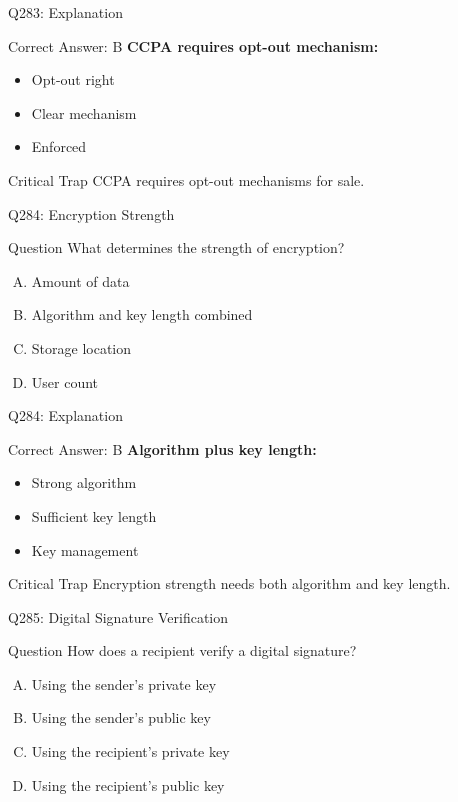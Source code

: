 \documentclass{beamer}
\begin{document}
	\begin{frame}{Q283: Explanation}
		\begin{block}{Correct Answer: B}
			\textbf{CCPA requires opt-out mechanism:}
			\begin{itemize}
				\item Opt-out right
				\item Clear mechanism
				\item Enforced
			\end{itemize}
		\end{block}
		\begin{alertblock}{Critical Trap}
			CCPA requires opt-out mechanisms for sale.
		\end{alertblock}
	\end{frame}
	
	\begin{frame}{Q284: Encryption Strength}
		\begin{block}{Question}
			What determines the strength of encryption?
		\end{block}
		\begin{enumerate}[(A)]
			\item Amount of data
			\item Algorithm and key length combined
			\item Storage location
			\item User count
		\end{enumerate}
	\end{frame}
	
	\begin{frame}{Q284: Explanation}
		\begin{block}{Correct Answer: B}
			\textbf{Algorithm plus key length:}
			\begin{itemize}
				\item Strong algorithm
				\item Sufficient key length
				\item Key management
			\end{itemize}
		\end{block}
		\begin{alertblock}{Critical Trap}
			Encryption strength needs both algorithm and key length.
		\end{alertblock}
	\end{frame}
	
	\begin{frame}{Q285: Digital Signature Verification}
		\begin{block}{Question}
			How does a recipient verify a digital signature?
		\end{block}
		\begin{enumerate}[(A)]
			\item Using the sender's private key
			\item Using the sender's public key
			\item Using the recipient's private key
			\item Using the recipient's public key
		\end{enumerate}
	\end{frame}
	
\end{document}
